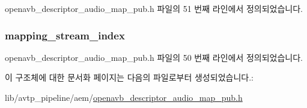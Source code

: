 openavb\+\_\+descriptor\+\_\+audio\+\_\+map\+\_\+pub.\+h 파일의 51 번째 라인에서 정의되었습니다.

\subsubsection[{\texorpdfstring{mapping\+\_\+stream\+\_\+index}{mapping_stream_index}}]{ mapping\+\_\+stream\+\_\+index}\hypertarget{structopenavb__aem__descriptor__audio__map__audio__mapping__format__t_aab5314b6aa5b4cad7c10713df06c06ff}{}\label{structopenavb__aem__descriptor__audio__map__audio__mapping__format__t_aab5314b6aa5b4cad7c10713df06c06ff}


openavb\+\_\+descriptor\+\_\+audio\+\_\+map\+\_\+pub.\+h 파일의 50 번째 라인에서 정의되었습니다.



이 구조체에 대한 문서화 페이지는 다음의 파일로부터 생성되었습니다.\+:\begin{DoxyCompactItemize}
\item 
lib/avtp\+\_\+pipeline/aem/\hyperlink{openavb__descriptor__audio__map__pub_8h}{openavb\+\_\+descriptor\+\_\+audio\+\_\+map\+\_\+pub.\+h}\end{DoxyCompactItemize}
